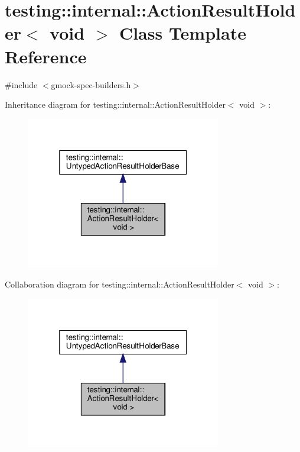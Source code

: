 \hypertarget{classtesting_1_1internal_1_1_action_result_holder_3_01void_01_4}{}\section{testing\+:\+:internal\+:\+:Action\+Result\+Holder$<$ void $>$ Class Template Reference}
\label{classtesting_1_1internal_1_1_action_result_holder_3_01void_01_4}


{\ttfamily \#include $<$gmock-\/spec-\/builders.\+h$>$}



Inheritance diagram for testing\+:\+:internal\+:\+:Action\+Result\+Holder$<$ void $>$\+:
\nopagebreak
\begin{figure}[H]
\begin{center}
\leavevmode
\includegraphics[width=241pt]{classtesting_1_1internal_1_1_action_result_holder_3_01void_01_4__inherit__graph}
\end{center}
\end{figure}


Collaboration diagram for testing\+:\+:internal\+:\+:Action\+Result\+Holder$<$ void $>$\+:
\nopagebreak
\begin{figure}[H]
\begin{center}
\leavevmode
\includegraphics[width=241pt]{classtesting_1_1internal_1_1_action_result_holder_3_01void_01_4__coll__graph}
\end{center}
\end{figure}
